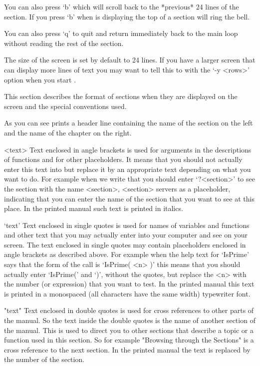 You can also press `b' which will scroll back to
the *previous* 24 lines of the section. If you press `b' when
{\GAP} is displaying the top of a section {\GAP} will ring the bell.

You can also press `q' to quit and return immediately back to the main
{\GAP} loop without reading the rest of the section.

The size of the screen is set by default to 24 lines.  If you have a larger
screen that can display more lines of text you may want to tell this to
{\GAP} with the `-y <rows>' option when you start {\GAP}.


This section describes the format of sections when they are displayed on
the screen and the special conventions used.

As you can see {\GAP} prints a header line
containing the name of the section on the left and the name of the
chapter on the right.

\begintt
<text>
\endtt
Text enclosed in angle brackets is used for arguments in the descriptions
of functions and for other placeholders. It means that you should not
actually enter this text into {\GAP} but replace it by an appropriate
text depending on what you want to do. For example when we write that
you should enter `?<section>' to see the section with the name <section>,
<section> servers as a placeholder, indicating that you can enter the
name of the section that you want to see at this place. In the printed
manual such text is printed in italics.

\begintt
`text'
\endtt
Text enclosed in single quotes is used for names of variables and
functions and other text that you may actually enter into your computer
and see on your screen. The text enclosed in single quotes may contain
placeholders enclosed in angle brackets as described above. For example
when the help text for `IsPrime' says that the form of the call is
`IsPrime( <n> )' this means that you should actually enter `IsPrime('
and `)', without the quotes, but replace the <n> with the number (or
expression) that you want to test. In the printed manual this text is
printed in a monospaced (all characters have the same width) typewriter
font.

\begintt
"text"
\endtt
Text enclosed in double quotes is used for cross references to other
parts of the manual. So the text inside the double quotes is the name of
another section of the manual. This is used to direct you to other
sections that describe a topic or a function used in this section. So
for example "Browsing through the Sections" is a cross reference to the next
section. In the printed manual the text is replaced by the number of the
section.

